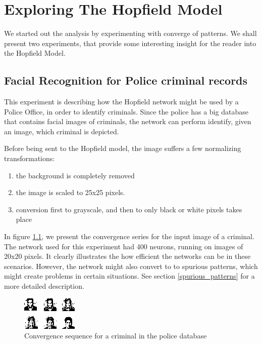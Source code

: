 \chapter{Exploring The Hopfield Model}

We started out the analysis by experimenting with converge of patterns. We shall present two experiments, that provide some interesting insight for the reader into the Hopfield Model.

\section{Facial Recognition for Police criminal records}

This experiment is describing how the Hopfield network might be used by a Police Office, in order to identify criminals. Since the police has a big database that contains facial images of criminals, the network can perform identify, given an image, which criminal is depicted.

Before being sent to the Hopfield model, the image suffers a few normalizing transformations:
\begin{enumerate}
 \item the background is completely removed
 \item the image is scaled to 25x25 pixels.
 \item conversion first to grayscale, and then to only black or white pixels takes place
\end{enumerate}

In figure \ref{fig:criminal}, we present the convergence series for the input image of a criminal. The network used for this experiment had 400 neurons, running on images of 20x20 pixels. It clearly illustrates the how efficient the networks can be in these scenarios. However, the network might also convert to to spurious patterns, which might create problems in certain situations. See section \ref{spurious_patterns} for a more detailed description.

\begin{figure}[h]
  \centering
\includegraphics[scale=2]{images/convergence/all.png}
\caption{Convergence sequence for a criminal in the police database}
\label{fig:criminal}
\end{figure}


